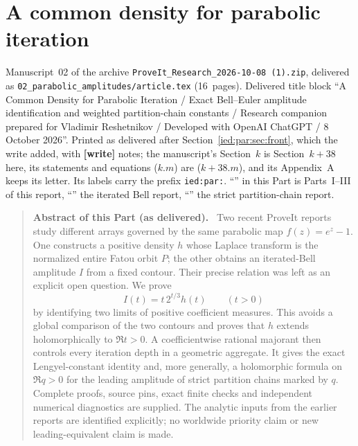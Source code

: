 \documentclass[11pt,letterpaper]{article}
\theoremstyle{remark}\newtheorem{remark}[theorem]{Remark}
\newcommand{\Oh}{\mathrm O}\newcommand{\supp}{\operatorname{supp}}
\newcommand{\file}[1]{\nolinkurl{#1}}
\newenvironment{partabstract}{\begin{quote}\small\noindent\textbf{Abstract of this Part (as delivered).}\ }{\end{quote}}
\newcommand{\partsource}[1]{\par\noindent\begin{minipage}{\textwidth}\small #1\end{minipage}\par\medskip}
\begin{document}
\clearpage
\part{A common density for parabolic iteration}\label{ied:par:part}
\renewcommand{\theequation}{\thesection.\arabic{equation}}
\renewcommand{\theHequation}{\theHsection.\arabic{equation}}
\renewcommand{\Oh}{\mathcal O}
\partsource{Manuscript~02 of the archive \texttt{ProveIt\_Research\_2026-10-08\ (1).zip},
delivered as \file{02_parabolic_amplitudes/article.tex} (16~pages). Delivered
title block ``A Common Density for Parabolic Iteration / Exact Bell--Euler
amplitude identification and weighted partition-chain constants / Research
companion prepared for Vladimir Reshetnikov / Developed with OpenAI ChatGPT /
8 October 2026''. Printed as delivered after Section~\ref{ied:par:sec:front},
which the write added, with \textbf{[write]} notes; the manuscript's
Section~$k$ is Section~$k+38$ here, its statements and equations ($k.m$) are
($k{+}38.m$), and its Appendix~A keeps its letter. Its labels carry the prefix
\file{ied:par:}. ``\cite{Euler}'' in this Part is Parts~I--III of this report,
``\cite{IBD}'' the iterated Bell report, ``\cite{Chains}'' the strict
partition-chain report.}
\begin{partabstract}
Two recent ProveIt reports study different arrays governed by the same
parabolic map $f(z)=e^z-1$. One constructs a positive density $h$ whose
Laplace transform is the normalized entire Fatou orbit $P$; the other
obtains an iterated-Bell amplitude $I$ from a fixed contour.
Their precise relation was left as an explicit open question. We prove
\[
 I(t)=t\,2^{t/3}h(t)\qquad(t>0)
\]
by identifying two limits of positive coefficient measures. This avoids
a global comparison of the two contours and proves that $h$ extends
holomorphically to $\Re t>0$. A coefficientwise rational majorant then
controls every iteration depth in a geometric aggregate. It gives the
exact Lengyel-constant identity and, more generally, a holomorphic
formula on $\Re q>0$ for the leading amplitude of strict partition chains
marked by $q$. Complete proofs, source pins, exact finite checks and
independent numerical diagnostics are supplied. The analytic inputs
from the earlier reports are identified explicitly; no worldwide
priority claim or new leading-equivalent claim is made.
\end{partabstract}
\end{document}
